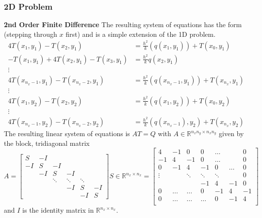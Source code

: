 \documentclass[letterpaper,12pt]{article}
\begin{document}
\subsubsection{2D Problem}
\textbf{2nd Order Finite Difference} The resulting system of equations has the form (stepping through $x$ first) and is a simple extension of the 1D problem.
\begin{align}
\label{2D2FDsys}
4 T(x_1, y_1) - T(x_2, y_1) &= \frac{h^2}{k} (q(x_1, y_1)) + T(x_0, y_1) \nonumber \\
-T(x_1, y_1) + 4 T(x_2, y_1) - T(x_3, y_1) &= \frac{h^2}{k} q(x_2, y_1) \nonumber \\
\vdots \nonumber \\
4 T(x_{n_x - 1}, y_1) - T(x_{n_x - 2}, y_1) &= \frac{h^2}{k} (q(x_{n_x - 1}, y_1)) + T(x_{n_x}, y_1)  \\
\vdots \nonumber \\
4 T(x_1, y_2) - T(x_2, y_2) &= \frac{h^2}{k} (q(x_1, y_2)) + T(x_0, y_2) \nonumber \\
\vdots \nonumber \\
4 T(x_{n_x - 1}, y_2) - T(x_{n_x - 2}, y_2) &= \frac{h^2}{k} (q(x_{n_x - 1}), y_2) + T(x_{n_x}, y_2) \nonumber
\end{align}
The resulting linear system of equations is $AT = Q$ with $A \in \mathbb{R}^{n_xn_y \times n_xn_y}$ given by the block, tridiagonal matrix
\[
A = 
\begin{bmatrix}
S & -I & &\\
-I & S & -I & \\
 & -I & S & -I \\
 & & \ddots & \ddots & \ddots \\
 & & & -I & S & -I \\
 & & & & -I & S
\end{bmatrix}
S \in \mathbb{R}^{n_x \times n_x} =
\begin{bmatrix}
4 & -1 & 0 & 0 & \dots &  & 0 \\
-1 & 4 & -1 & 0 & \dots &  & 0\\
0 & -1 & 4 & -1 & 0 & \dots & 0 \\
\vdots &  & \ddots & \ddots & \ddots & & 0 \\
 & & & -1 & 4 & -1 & 0 \\
0 & \dots & \dots & 0 & -1 & 4 & -1 \\
0 & \dots & \dots & \dots & 0 & -1 & 4 \\
\end{bmatrix}
\]
and $I$ is the identity matrix in $\mathbb{R}^{n_x \times n_x}$.
\end{document}
